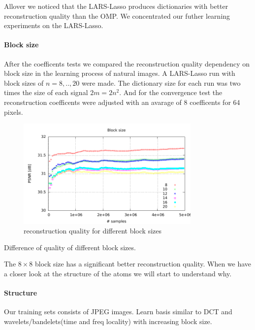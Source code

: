 Allover we noticed that the LARS-Lasso produces dictionaries with better
reconstruction quality than the OMP. We concentrated our futher learning
experiments on the LARS-Lasso. 

\paragraph{Block size}
After the coefficents tests we compared the reconstruction quality dependency on
block size in the learning process of natural images. A LARS-Lasso run with
block sizes of $n=8,..,20$ were made. The dictionary size for each run was two
times the size of each signal $2m=2n^2$. And for the convergence test the
reconstruction coefficents were adjusted with an avarage of 8 coefficents for 64
pixels.

\begin{figure}[h]
\centering
\includegraphics[width =
0.8\textwidth]{../tests/results/blockSizeConverg.pdf}
\caption{reconstruction quality for different block sizes}
\label{fig:dict size}
\end{figure}

Difference of quality of different block sizes.

The $8\times8$ block size has a significant better reconstruction quality. 
When we have a closer look at the structure of the atoms we will start to
understand why.

\paragraph{Structure}
Our training sets consists of JPEG images. 
Learn basis similar to DCT and wavelets/bandelets(time and freq locality) with
increasing block size.

